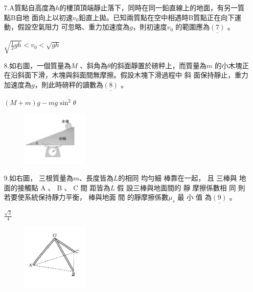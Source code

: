\documentclass[cn,10pt,math=newtx]{elegantbook}
\begin{document}
\begin{example}
   7.A質點自高度為$h$的樓頂頂端靜止落下，同時在同一鉛直線上的地面，有另一質點B自地
面向上以初速$v_0$鉛直上拋。已知兩質點在空中相遇時B質點正在向下運動，假設空氣阻力
可忽略、重力加速度為$ g$，則初速度$v_0$ 的範圍應為$\underline{(7)}$ 。
\\
    \rightline{[文華高中教甄109]}
\end{example}
\begin{solution}
    $\sqrt{\frac{1}{2} gh} < v_0 < \sqrt{gh}$
\end{solution}

\newpage


\begin{example}
   8.如右圖，一個質量為$ M$ 、斜角為$\theta$的斜面靜置於磅秤上，而質量為$m$ 的小木塊正在沿斜面下滑，木塊與斜面間無摩擦。假設木塊下滑過程中 斜
面保持靜止，重力加速度為$ g$，則此時磅秤的讀數為$\underline{(8)}$ 。
\\
    \rightline{[文華高中教甄109]}
\end{example}
\begin{solution}
    $(M+m)g-mg\sin^2 {\theta}$
\end{solution}
\begin{figure}[htbp]
    \flushright
    \includegraphics[width=0.3\textwidth]{image/109文華8.png}
  \end{figure}
\newpage


\begin{example}
   9.如右圖， 三根質量為$m$、長度皆為$L$的相同 均勻細 棒靠在一起， 且 三棒與
地面的接觸點 A 、 B 、 C 間 距皆為$L$ 假 設三棒與地面間的 靜 摩擦係數相
同 則 若要使系統保持靜力平衡， 棒與地面 間 的靜摩擦係數$\mu_s$ 最 小
值 為$\underline{(9)}$ 。
\\
    \rightline{[文華高中教甄109]}
\end{example}
\begin{solution}
    $\frac{\sqrt{2}} {4}$
\end{solution}
\begin{figure}[htbp]
    \flushright
    \includegraphics[width=0.3\textwidth]{image/109文華9.png}
  \end{figure}
\newpage
\end{document}
